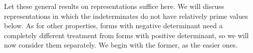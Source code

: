 Let these general results on representations suffice here. We will discuss representations in which the indeterminates do not have relatively prime values below. As for other properties, forms with negative determinant need a completely different treatment from forms with positive determinant, so we will now consider them separately. We begin with the former, as the easier ones.
